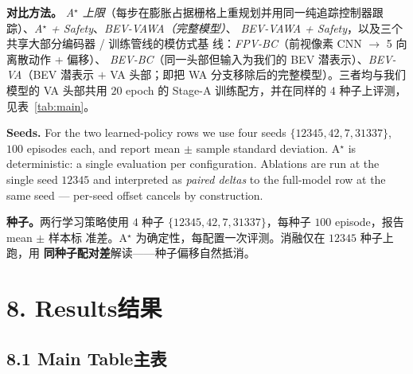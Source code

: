 \documentclass[11pt,a4paper]{article}
\newcommand{\en}[1]{\par\noindent #1\par\vspace{0.15em}}
\newcommand{\zh}[1]{\par\noindent\color{zhcol}\hspace{0.5em}#1\par\color{black}\vspace{0.6em}}
\newcommand{\bisec}[2]{\section[#1]{#1\quad\normalfont\small\color{zhcol}\textsf{#2}}}
\newcommand{\bisubsec}[2]{\subsection[#1]{#1\quad\normalfont\small\color{zhcol}\textsf{#2}}}
\begin{document}
\zh{\textsf{\textbf{对比方法。}
\emph{A$^\star$ 上限}（每步在膨胀占据栅格上重规划并用同一纯追踪控制器跟
踪）、\emph{A$^\star$ + Safety}、\emph{BEV-VAWA（完整模型）}、
\emph{BEV-VAWA + Safety}，以及三个共享大部分编码器 / 训练管线的模仿式基
线：\emph{FPV-BC}（前视像素 CNN $\to$ 5 向离散动作 + 偏移）、
\emph{BEV-BC}（同一头部但输入为我们的 BEV 潜表示）、\emph{BEV-VA}（BEV
潜表示 $+$ VA 头部；即把 WA 分支移除后的完整模型）。三者均与我们模型的
VA 头部共用 $20$ epoch 的 Stage-A 训练配方，并在同样的 $4$ 种子上评测，
见表~\ref{tab:main}。}}

\en{\textbf{Seeds.} For the two learned-policy rows we use four seeds
$\{12345, 42, 7, 31337\}$, $100$ episodes each, and report mean $\pm$
sample standard deviation. A$^\star$ is deterministic: a single evaluation
per configuration. Ablations are run at the single seed $12345$ and
interpreted as \emph{paired deltas} to the full-model row at the same
seed — per-seed offset cancels by construction.}

\zh{\textsf{\textbf{种子。}两行学习策略使用 $4$ 种子
$\{12345, 42, 7, 31337\}$，每种子 $100$ episode，报告 mean $\pm$ 样本标
准差。A$^\star$ 为确定性，每配置一次评测。消融仅在 $12345$ 种子上跑，用
\textbf{同种子配对差}解读——种子偏移自然抵消。}}

\bisec{8. Results}{结果}\label{sec:results}

\bisubsec{8.1 Main Table}{主表}
\end{document}
